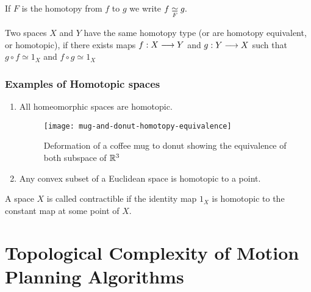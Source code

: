 \begin{notn}
If $F$ is the homotopy from $f$ to $g$ we write $\displaystyle f \underset{F}{\simeq} g.$
\end{notn}

\begin{defn}
Two spaces $X$ and $Y$ have the same homotopy type (or are homotopy equivalent, or homotopic), if there exists maps $f: X \longrightarrow Y$ and $g : Y \longrightarrow X$ such that $g \circ f \simeq 1_X$ and $f \circ g \simeq 1_X$
\end{defn}

\subsection*{Examples of Homotopic spaces}
\begin{enumerate}
\item All homeomorphic spaces are homotopic.
\begin{figure}[H]
    \centering
    \texttt{[image: mug-and-donut-homotopy-equivalence]}
    \caption{Deformation of a coffee mug to donut showing the equivalence of both subspace of $\mathbb{R}^3$}
\end{figure}
\item Any convex subset of a Euclidean space is homotopic to a point.
\end{enumerate}

\begin{defn}
A space $X$ is called contractible if the identity map $1_X$ is homotopic to the constant map at some point of $X$.
\end{defn}


\chapter{Topological Complexity of Motion Planning Algorithms}

